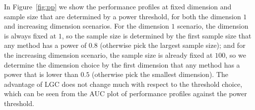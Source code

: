 \documentclass[11pt]{article}
\begin{document}
In Figure~\ref{fig:pp} we show the performance profiles at fixed dimension and sample size that are determined by a power threshold, for both the dimension $1$ and increasing dimension scenarios. For the dimension $1$ scenario, the dimension is always fixed at $1$, so the sample size is determined by the first sample size that any method has a power of $0.8$ (otherwise pick the largest sample size); and for the increasing dimension scenario, the sample size is already fixed at $100$, so we determine the dimension choice by the first dimension that any method has a power that is lower than $0.5$ (otherwise pick the smallest dimension). The advantage of LGC does not change much with respect to the threshold choice, which can be seen from the AUC plot of performance profiles against the power threshold.


\begin{figure}[htbp]
\hfil
{}
\hfil
{}
\end{figure}
\end{document}
